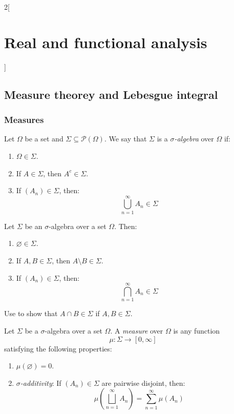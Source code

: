 \documentclass[../../../main_math.tex]{subfiles}
\begin{document}
\renewcommand{\col}{\ana}
\begin{multicols}{2}[\section{Real and functional analysis}]
  \subsection{Measure theorey and Lebesgue integral}
  \subsubsection{Measures}
  \begin{definition}
    Let $\Omega$ be a  set and $\Sigma\subseteq\mathcal{P}(\Omega)$. We say that $\Sigma$ is a \emph{$\sigma$-algebra} over $\Omega$ if:
    \begin{enumerate}
      \item $\Omega\in\Sigma$.
      \item If $A\in\Sigma$, then $A^c\in\Sigma$.
      \item If $(A_n)\in\Sigma$, then: $$\bigcup_{n=1}^\infty A_n\in\Sigma$$
    \end{enumerate}
  \end{definition}
  \begin{proposition}
    Let $\Sigma$ be an $\sigma$-algebra over a set $\Omega$. Then:
    \begin{enumerate}
      \item $\varnothing\in\Sigma$.
      \item If $A,B\in\Sigma$, then $A\setminus B\in\Sigma$.
      \item If $(A_n)\in\Sigma$, then: $$\bigcap_{n=1}^\infty A_n\in\Sigma$$
    \end{enumerate}
  \end{proposition}
  \begin{sproof}
    Use  to show that $A\cap B\in \Sigma$ if $A,B\in\Sigma$.
  \end{sproof}
  \begin{definition}[Measure]
    Let $\Sigma$ be a $\sigma$-algebra over a set $\Omega$. A \emph{measure} over $\Omega$ is any function $$\mu:\Sigma\longrightarrow[0,\infty]$$ satisfying the following properties:
    \begin{enumerate}[ref = $\sigma$-additivity]
      \item $\mu(\varnothing)=0$.
            \item\label{RFA_sigmaadditivity} \emph{$\sigma$-additivity}: If $(A_n)\in\Sigma$ are pairwise disjoint, then: $$\mu\left(\bigsqcup_{n=1}^\infty A_n\right)=\sum_{n=1}^\infty \mu(A_n)$$

\end{enumerate}
\end{definition}
\end{multicols}
\end{document}

